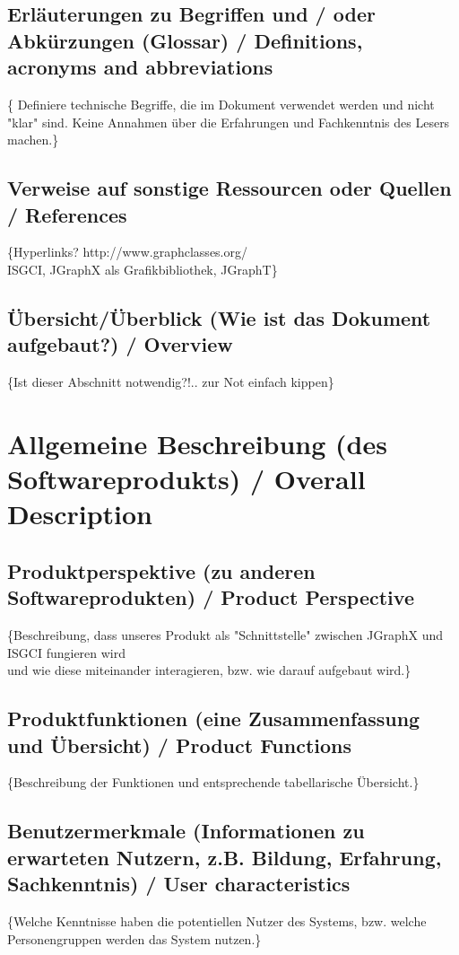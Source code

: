\documentclass[11pt,a4paper]{article}
\begin{document}
  	\subsection{Erläuterungen zu Begriffen und / oder Abkürzungen (Glossar) / Definitions, acronyms and abbreviations} %
	\{        Definiere technische Begriffe, die im Dokument verwendet werden und nicht "klar" sind.
	        Keine Annahmen über die Erfahrungen und Fachkenntnis des Lesers machen.\}
  	\subsection{Verweise auf sonstige Ressourcen oder Quellen / References} %
  	\{Hyperlinks? http://www.graphclasses.org/\\
          ISGCI, JGraphX als Grafikbibliothek, JGraphT\}
  	\subsection{Übersicht/Überblick (Wie ist das Dokument aufgebaut?) / Overview} %
  	\{Ist dieser Abschnitt notwendig?!.. zur Not einfach kippen\}
  	
\newpage
\section{Allgemeine Beschreibung (des Softwareprodukts) / Overall Description} %
  	\subsection{Produktperspektive (zu anderen Softwareprodukten) / Product Perspective} %
	\{Beschreibung, dass unseres Produkt als "Schnittstelle" zwischen JGraphX und ISGCI fungieren wird\\
	und wie diese miteinander interagieren, bzw. wie darauf aufgebaut wird.\}
  	\subsection{Produktfunktionen (eine Zusammenfassung und Übersicht) / Product Functions}  %
	\{Beschreibung der Funktionen und entsprechende tabellarische Übersicht.\}     
    \subsection{Benutzermerkmale (Informationen zu erwarteten Nutzern, z.B. Bildung, Erfahrung, Sachkenntnis) / User characteristics} %
	\{Welche Kenntnisse haben die potentiellen Nutzer des Systems, bzw. welche Personengruppen werden das System nutzen.\}    
\end{document}
